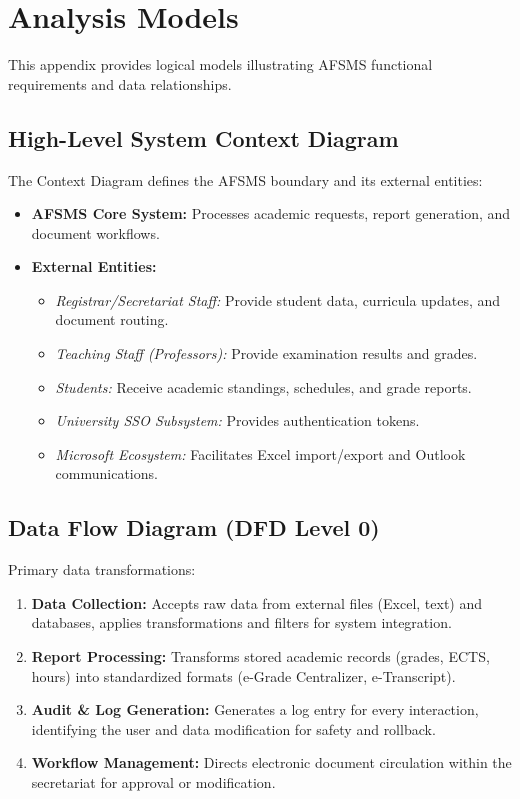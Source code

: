 \documentclass[11pt, a4paper]{article}
\begin{document}
\section{Analysis Models}
This appendix provides logical models illustrating AFSMS functional requirements and data relationships.

\subsection{High-Level System Context Diagram}
The Context Diagram defines the AFSMS boundary and its external entities:
\begin{itemize}
    \item \textbf{AFSMS Core System:} Processes academic requests, report generation, and document workflows.
    \item \textbf{External Entities:}
    \begin{itemize}
        \item \textit{Registrar/Secretariat Staff:} Provide student data, curricula updates, and document routing.
        \item \textit{Teaching Staff (Professors):} Provide examination results and grades.
        \item \textit{Students:} Receive academic standings, schedules, and grade reports.
        \item \textit{University SSO Subsystem:} Provides authentication tokens.
        \item \textit{Microsoft Ecosystem:} Facilitates Excel import/export and Outlook communications.
    \end{itemize}
\end{itemize}

\subsection{Data Flow Diagram (DFD Level 0)}
Primary data transformations:
\begin{enumerate}
    \item \textbf{Data Collection:} Accepts raw data from external files (Excel, text) and databases, applies transformations and filters for system integration.
    \item \textbf{Report Processing:} Transforms stored academic records (grades, ECTS, hours) into standardized formats (e-Grade Centralizer, e-Transcript).
    \item \textbf{Audit \& Log Generation:} Generates a log entry for every interaction, identifying the user and data modification for safety and rollback.
    \item \textbf{Workflow Management:} Directs electronic document circulation within the secretariat for approval or modification.
\end{enumerate}
\end{document}
